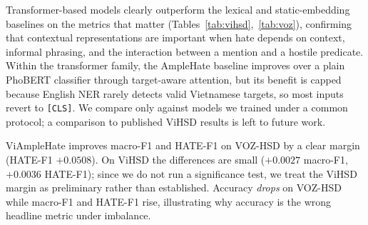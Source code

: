 \documentclass[11pt]{article}
\begin{document}
\begin{table}[!t]
  \centering
  \small
  \caption{Results on VOZ-HSD (test). Best per column in bold among models (accuracy shown for reference; the baseline has the highest accuracy).}
  \label{tab:voz}
\end{table}

Transformer-based models clearly outperform the lexical and static-embedding baselines on the metrics that matter (Tables~\ref{tab:vihsd},~\ref{tab:voz}), confirming that contextual representations are important when hate depends on context, informal phrasing, and the interaction between a mention and a hostile predicate. Within the transformer family, the AmpleHate baseline improves over a plain PhoBERT classifier through target-aware attention, but its benefit is capped because English NER rarely detects valid Vietnamese targets, so most inputs revert to \texttt{[CLS]}. We compare only against models we trained under a common protocol; a comparison to published ViHSD results is left to future work.

ViAmpleHate improves macro-F1 and HATE-F1 on VOZ-HSD by a clear margin (HATE-F1 $+0.0508$). On ViHSD the differences are small ($+0.0027$ macro-F1, $+0.0036$ HATE-F1); since we do not run a significance test, we treat the ViHSD margin as preliminary rather than established. Accuracy \emph{drops} on VOZ-HSD while macro-F1 and HATE-F1 rise, illustrating why accuracy is the wrong headline metric under imbalance.
\end{document}
